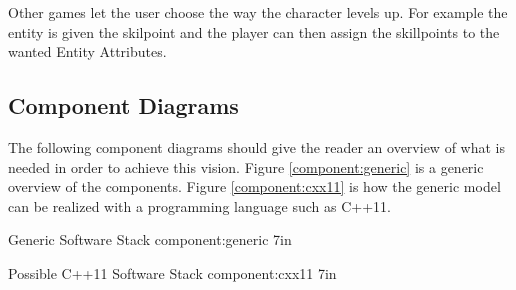 Other games let the user choose the way the character levels up. For example
the entity is given the skilpoint and the player can then assign the
skillpoints to the wanted Entity Attributes.

\subsection{Component Diagrams}

The following component diagrams should give the reader an overview of what is
needed in order to achieve this vision. Figure \ref{component:generic} is a
generic overview of the components. Figure \ref{component:cxx11} is how the 
generic model can be realized with a programming language such as C++11.

%
       {Generic Software Stack}%
       {component:generic}%
       {7in}

%
       {Possible C++11 Software Stack}%
       {component:cxx11}%
       {7in}


